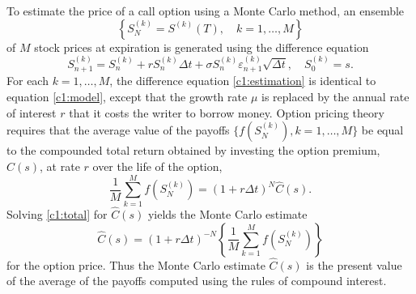 To estimate the price of a call option using a Monte Carlo method, an ensemble
\begin{equation*}
	\left\{ S_N^{(k)} = S^{(k)}(T), \quad k = 1, \dots, M \right\}
\end{equation*}
of $M$ stock prices at expiration is generated using the difference equation
\begin{equation}
	S_{n+1}^{(k)} = S_n^{(k)} + r S_n^{(k)} \Delta t + \sigma S_n^{(k)} \varepsilon_{n+1}^{(k)} \sqrt{\Delta t}, \quad S_0^{(k)} = s.
	\label{c1:estimation}
\end{equation}
For each $k = 1, \dots, M$, the difference equation \eqref{c1:estimation} is identical to equation \eqref{c1:model}, except that the growth rate $\mu$ is replaced by the annual rate of interest $r$ that it costs the writer to borrow money. Option pricing theory requires that the average value of the payoffs $\{f(S_N^{(k)}), k = 1, \dots, M\}$ be equal to the compounded total return obtained by investing the option premium, $\hat{C}(s)$, at rate $r$ over the life of the option,
\begin{equation}
	\frac{1}{M} \sum_{k=1}^M f(S_N^{(k)}) = (1 + r \Delta t)^N \hat{C}(s).
	\label{c1:total}
\end{equation}
Solving \eqref{c1:total} for $\hat{C}(s)$ yields the Monte Carlo estimate
\begin{equation}
	\hat{C}(s) = (1 + r \Delta t)^{-N} \left\{ \frac{1}{M} \sum_{k=1}^M f(S_N^{(k)}) \right\}
	\label{c1:monte_carlo_estimation}
\end{equation}
for the option price. Thus the Monte Carlo estimate $\hat{C}(s)$ is the present value of the average of the payoffs computed using the rules of compound interest.